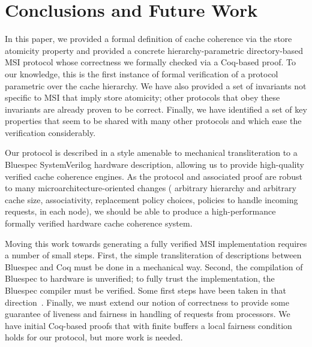 \section{Conclusions and Future Work}

In this paper, we provided a formal definition of cache coherence via the store
atomicity property and provided a concrete hierarchy-parametric directory-based
MSI protocol whose correctness we formally checked via a Coq-based proof. To our
knowledge, this is the first instance of formal verification of a protocol parametric
over the cache hierarchy. We have also provided a set of invariants not
specific to MSI that imply store atomicity; other protocols that obey these
invariants are already proven to be correct. Finally, we have identified a set
of key properties that seem to be shared with many other protocols and which ease
the verification considerably.

Our protocol is described in a style amenable to mechanical transliteration to a
Bluespec SystemVerilog hardware description, allowing us to provide high-quality
verified cache coherence engines. As the protocol and associated proof are robust
to many microarchitecture-oriented changes (\eg{} arbitrary hierarchy and
arbitrary cache size, associativity, replacement policy choices, policies to
handle incoming requests, \etc{} in each node), we should be able to produce a
high-performance formally verified hardware cache coherence system.

Moving this work towards generating a fully verified MSI implementation
requires a number of small steps. First, the simple transliteration of
descriptions between Bluespec and Coq must be done in a mechanical way.
Second, the compilation of Bluespec to hardware is unverified; to fully trust
the implementation, the Bluespec compiler must be verified. Some first steps
have been taken in that direction~\cite{DBLP:conf/cav/BraibantC13}. Finally, we must
extend our notion of correctness to provide some guarantee of
liveness and fairness in handling of requests from processors. We have
initial Coq-based proofs that with finite buffers a local fairness condition
holds for our protocol, but more work is needed. 


